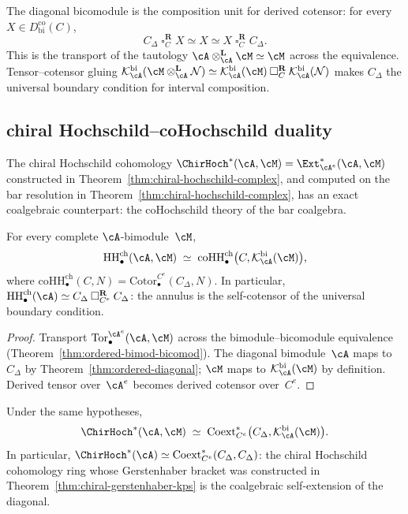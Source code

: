 The diagonal bicomodule is the composition unit for derived
cotensor: for every $X \in D^{\mathrm{co}}_{\mathrm{bi}}(C)$,
\[
 C_\Delta \mathbin{\square}_C^{\mathbf{R}} X
 \simeq X
 \simeq X \mathbin{\square}_C^{\mathbf{R}} C_\Delta.
\]
This is the transport of the tautology
$\cA \otimes_\cA^{\mathbf{L}} \cM \simeq \cM$ across the
equivalence. Tensor--cotensor
gluing $\mathcal{K}_\cA^{\mathrm{bi}}(\cM \otimes_\cA^{\mathbf{L}}
\mathcal{N}) \simeq \mathcal{K}_\cA^{\mathrm{bi}}(\cM)
\mathbin{\square}_C^{\mathbf{R}}
\mathcal{K}_\cA^{\mathrm{bi}}(\mathcal{N})$ makes $C_\Delta$ the
universal boundary condition for interval composition.

\subsection{chiral Hochschild--coHochschild duality}

The chiral Hochschild cohomology
$\ChirHoch^*(\cA, \cM) = \Ext^*_{\cA^e}(\cA, \cM)$ constructed in
Theorem~\ref{thm:chiral-hochschild-complex}, and computed on the bar
resolution in Theorem~\ref{thm:chiral-hochschild-complex}, has an
exact coalgebraic counterpart: the coHochschild theory of the bar
coalgebra.

\begin{theorem}
\label{thm:ordered-HH-coHH-homology}
For every complete $\cA$-bimodule~$\cM$,
\[
 \mathrm{HH}^{\mathrm{ch}}_\bullet(\cA, \cM)
 \;\simeq\;
 \mathrm{coHH}^{\mathrm{ch}}_\bullet
 \bigl(C, \mathcal{K}_\cA^{\mathrm{bi}}(\cM)\bigr),
\]
where
$\mathrm{coHH}^{\mathrm{ch}}_\bullet(C, N) =
\mathrm{Cotor}_\bullet^{C^e}(C_\Delta, N)$.
In particular,
$\mathrm{HH}^{\mathrm{ch}}_\bullet(\cA) \simeq
C_\Delta \mathbin{\square}_{C^e}^{\mathbf{R}} C_\Delta$:
the annulus is the self-cotensor of the universal boundary
condition.
\end{theorem}

\begin{proof}
Transport $\mathrm{Tor}_\bullet^{\cA^e}(\cA, \cM)$ across the
bimodule--bicomodule equivalence
(Theorem~\ref{thm:ordered-bimod-bicomod}). The diagonal
bimodule~$\cA$ maps to~$C_\Delta$ by
Theorem~\ref{thm:ordered-diagonal}; $\cM$ maps to
$\mathcal{K}_\cA^{\mathrm{bi}}(\cM)$ by definition.
Derived tensor over~$\cA^e$ becomes derived cotensor
over~$C^e$.
\end{proof}

\begin{theorem}
\label{thm:ordered-HH-coHH-cohomology}
Under the same hypotheses,
\[
 \ChirHoch^*(\cA, \cM)
 \;\simeq\;
 \mathrm{Coext}_{C^e}^*
 \bigl(C_\Delta,
 \mathcal{K}_\cA^{\mathrm{bi}}(\cM)\bigr).
\]
In particular,
$\ChirHoch^*(\cA) \simeq
\mathrm{Coext}_{C^e}^*(C_\Delta, C_\Delta)$: the chiral
Hochschild cohomology ring whose Gerstenhaber bracket was
constructed in Theorem~\textup{\ref{thm:chiral-gerstenhaber-kps}} is
the coalgebraic self-extension of the diagonal.
\end{theorem}

